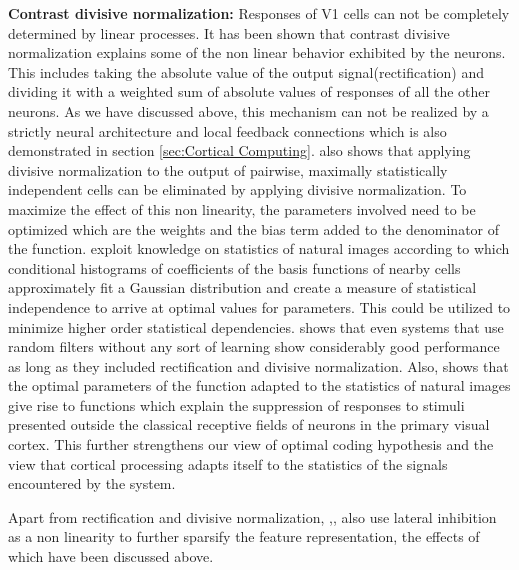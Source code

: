 \documentclass[12pt,twoside]{article}
\theoremstyle{plain}
\theoremstyle{definition}
\theoremstyle{remark}
\begin{document}
\textbf{Contrast divisive normalization: }Responses of V1 cells can not be completely determined by linear processes. It has been shown that contrast divisive normalization explains some of the non linear behavior exhibited by the neurons\cite{Bonds1989}. This includes taking the absolute value of the output signal(rectification) and dividing it with a weighted sum of absolute values of responses of all the other neurons. As we have discussed above, this mechanism can not be realized by a strictly neural architecture and local feedback connections which is also demonstrated in section \ref{sec:Cortical Computing}. \cite{Bonds1989} also shows that applying divisive normalization to the output of pairwise, maximally statistically  independent cells can be eliminated by applying divisive normalization. To maximize the effect of this non linearity, the parameters involved need to be optimized which are the weights and the bias term added to the denominator of the function.\cite{RobertoValerio2003} exploit knowledge on statistics of natural images according to which conditional histograms of coefficients of the basis functions of nearby cells approximately fit a Gaussian distribution\cite{SchwartzO2001} and create a measure of statistical independence to arrive at optimal values for parameters. This could be utilized to minimize higher order statistical dependencies. \cite{KevinJarret2009} shows that even systems that use random filters without any sort of learning show considerably good performance as long as they included rectification and divisive normalization. Also,\cite{EeroP.Simoncelli1999} shows that the optimal parameters of the function adapted to the statistics of natural images give rise to functions which explain the suppression of responses to stimuli presented outside the classical receptive fields of neurons in the primary visual cortex. This further strengthens our view of optimal coding hypothesis and the view that cortical processing adapts itself to the statistics of the signals encountered by the system.  

Apart from rectification and divisive normalization, \cite{JimMutch2008},\cite{MarkusLessmann2014},\cite{ThomasSerre2007} also use lateral inhibition as a non linearity to further sparsify the feature representation, the effects of which have been discussed above. 
\end{document}
